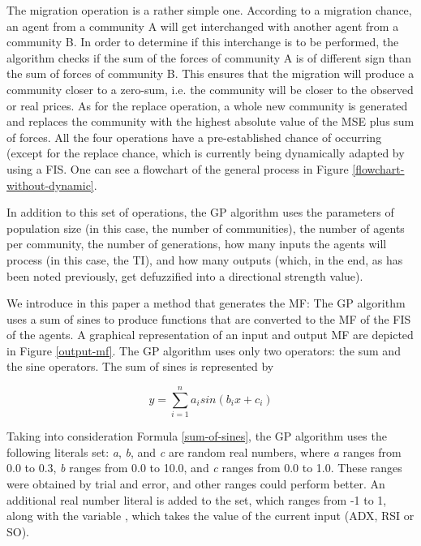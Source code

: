 \documentclass[a4paper,twoside]{article}
\begin{document}
The migration operation is a rather simple one. According to a
migration chance, an agent from a community A will get interchanged
with another agent from a community B. In order to determine if this
interchange is to be performed, the algorithm checks if the sum of the
forces of community A is of different sign than the sum of forces of
community B. This ensures that the migration will produce a community
closer to a zero-sum, i.e. the community will be closer to the
observed or real prices. As for the replace operation, a whole new
community is generated and replaces the community with the highest
absolute value of the MSE plus sum of forces. All the four operations
have a pre-established chance of occurring (except for the replace
chance, which is currently being dynamically adapted by using a FIS.
One can see a flowchart of the general process in Figure
\ref{flowchart-without-dynamic}. %

In addition to this set of operations, the GP algorithm uses the
parameters of population size (in this case, the number of
communities), the number of agents per community, the number of
generations, how many inputs the agents will process (in this case,
the TI), and how many outputs (which, in the end, as has been noted
previously, get defuzzified into a directional strength value). %

We introduce in this paper a method  that generates the MF: The GP algorithm uses a sum of
sines to produce functions that are converted to the MF of the FIS of
the agents. A graphical representation of an input and output MF 
are depicted in Figure \ref{output-mf}. The GP algorithm uses only two operators: the sum and
the sine operators. The sum of sines is represented by

\begin{equation} \label{sum-of-sines}
  y = \sum_{i=1}^{n} a_{i} sin(b_{i}x + c_{i})
\end{equation}

Taking into consideration Formula \ref{sum-of-sines}, the GP algorithm
uses the following literals set: \textit{a}, \textit{b}, and
\textit{c} are random real numbers, where \textit{a} ranges from 0.0
to 0.3, \textit{b} ranges from 0.0 to 10.0, and \textit{c} ranges from
0.0 to 1.0. These ranges were obtained by trial and error, and other
ranges could perform better. An additional real number literal is
added to the set, which ranges from -1 to 1, along with the variable
, which takes the value of the current input (ADX, RSI or
SO). 
\end{document}
